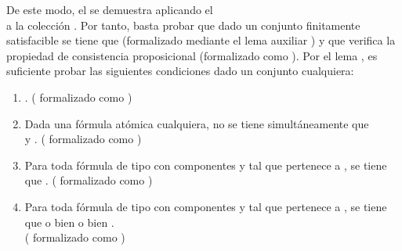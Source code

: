 \begin{isabellebody}
\begin{isamarkuptext}
  De este modo, el  se demuestra aplicando el \\  a la colección . Por tanto, basta probar que dado un conjunto finitamente satisfacible 
   se tiene que  (formalizado mediante el lema auxiliar ) y que  
  verifica la propiedad de consistencia proposicional (formalizado como ). Por el 
  lema , es suficiente probar las siguientes condiciones dado un conjunto  cualquiera:
    \begin{enumerate}
     \item {}. (\isa{{\isasymLongrightarrow}} formalizado como )
     \item Dada  una fórmula atómica cualquiera, no se tiene 
      simultáneamente que\\  y . (\isa{{\isasymLongrightarrow}} formalizado como )
     \item Para toda fórmula de tipo \isa{{\isasymalpha}} con componentes  y  tal que \isa{{\isasymalpha}}
      pertenece a , se tiene que . (\isa{{\isasymLongrightarrow}} formalizado como 
      )
     \item Para toda fórmula de tipo \isa{{\isasymbeta}} con componentes  y  tal que \isa{{\isasymbeta}}
      pertenece a , se tiene que o bien  o 
      bien .\\ (\isa{{\isasymLongrightarrow}} formalizado como )

\end{enumerate}
\end{isamarkuptext}
\end{isabellebody}
